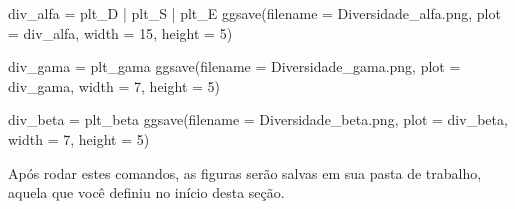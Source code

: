 \documentclass[
]{book}
\newenvironment{Shaded}{\begin{snugshade}}{\end{snugshade}}
\newcommand{\AttributeTok}[1]{\textcolor[rgb]{0.77,0.63,0.00}{#1}}
\newcommand{\DecValTok}[1]{\textcolor[rgb]{0.00,0.00,0.81}{#1}}
\newcommand{\FunctionTok}[1]{\textcolor[rgb]{0.00,0.00,0.00}{#1}}
\newcommand{\NormalTok}[1]{#1}
\newcommand{\OtherTok}[1]{\textcolor[rgb]{0.56,0.35,0.01}{#1}}
\newcommand{\SpecialCharTok}[1]{\textcolor[rgb]{0.00,0.00,0.00}{#1}}
\newcommand{\StringTok}[1]{\textcolor[rgb]{0.31,0.60,0.02}{#1}}
\begin{document}
\begin{Shaded}
\begin{Highlighting}[]
\NormalTok{div\_alfa }\OtherTok{=}\NormalTok{ plt\_D }\SpecialCharTok{|}\NormalTok{ plt\_S }\SpecialCharTok{|}\NormalTok{ plt\_E}
\FunctionTok{ggsave}\NormalTok{(}\AttributeTok{filename =} \StringTok{\textquotesingle{}Diversidade\_alfa.png\textquotesingle{}}\NormalTok{, }
       \AttributeTok{plot =}\NormalTok{ div\_alfa, }
       \AttributeTok{width =} \DecValTok{15}\NormalTok{, }\AttributeTok{height =} \DecValTok{5}\NormalTok{)}

\NormalTok{div\_gama }\OtherTok{=}\NormalTok{ plt\_gama}
\FunctionTok{ggsave}\NormalTok{(}\AttributeTok{filename =} \StringTok{\textquotesingle{}Diversidade\_gama.png\textquotesingle{}}\NormalTok{, }
       \AttributeTok{plot =}\NormalTok{ div\_gama, }
       \AttributeTok{width =} \DecValTok{7}\NormalTok{, }\AttributeTok{height =} \DecValTok{5}\NormalTok{)}

\NormalTok{div\_beta }\OtherTok{=}\NormalTok{ plt\_beta}
\FunctionTok{ggsave}\NormalTok{(}\AttributeTok{filename =} \StringTok{\textquotesingle{}Diversidade\_beta.png\textquotesingle{}}\NormalTok{, }
       \AttributeTok{plot =}\NormalTok{ div\_beta,}
       \AttributeTok{width =} \DecValTok{7}\NormalTok{, }\AttributeTok{height =} \DecValTok{5}\NormalTok{)}
\end{Highlighting}
\end{Shaded}

Após rodar estes comandos, as figuras serão salvas em sua pasta de trabalho, aquela que você definiu no início desta seção.

  
\end{document}
